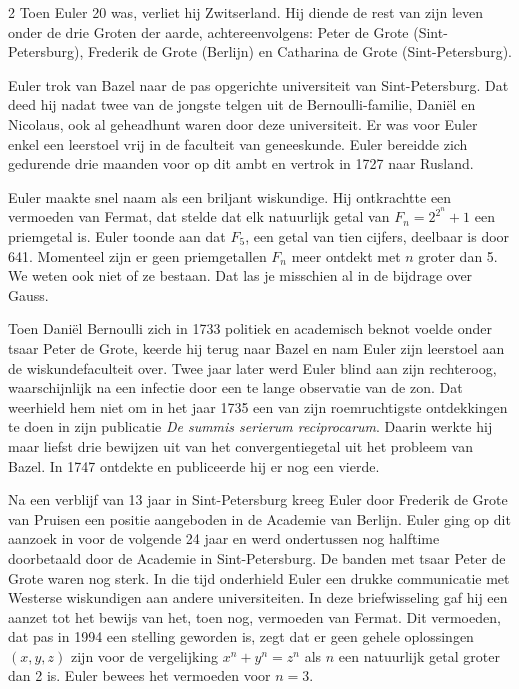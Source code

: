 \begin{multicols}{2}
	Toen Euler 20 was, verliet hij Zwitserland. Hij diende de rest van zijn leven onder de drie Groten der aarde, achtereenvolgens: Peter de Grote (Sint-Petersburg), Frederik de Grote (Berlijn) en Catharina de Grote (Sint-Petersburg).
	
	Euler trok van Bazel naar de pas opgerichte universiteit van Sint-Petersburg. Dat deed hij nadat twee van de jongste telgen uit de Bernoulli-familie, Daniël en Nicolaus, ook al  geheadhunt waren door deze universiteit. Er was voor Euler enkel een leerstoel vrij in de faculteit van geneeskunde. Euler bereidde zich gedurende drie maanden voor op dit ambt en vertrok in 1727 naar Rusland. 
	
	Euler maakte snel naam als een briljant wiskundige. Hij ontkrachtte een vermoeden van Fermat, dat stelde dat elk natuurlijk getal van $F_n=2^{2^n}+1$ een priemgetal is. Euler toonde aan dat $F_5$, een getal van tien cijfers, deelbaar is door 641. Momenteel zijn er geen priemgetallen $F_n$ meer ontdekt met $n$ groter dan 5. We weten ook niet of ze bestaan. Dat las je misschien al in de bijdrage over Gauss.
	
	Toen Daniël Bernoulli zich in 1733 politiek en academisch beknot voelde onder tsaar Peter de Grote, keerde hij terug naar Bazel en nam Euler zijn leerstoel aan de wiskundefaculteit over. Twee jaar later werd Euler blind aan zijn rechteroog, waarschijnlijk na een infectie door een te lange observatie van de zon. Dat weerhield hem niet om in het jaar 1735 een van zijn roemruchtigste ontdekkingen te doen in zijn publicatie \emph{De summis serierum reciprocarum}. Daarin werkte hij maar liefst drie bewijzen uit van het convergentiegetal uit het probleem van Bazel. In 1747 ontdekte en publiceerde hij er nog een vierde.
	
	Na een verblijf van 13 jaar in Sint-Petersburg kreeg Euler door Frederik de Grote van Pruisen een positie aangeboden in de Academie van Berlijn. Euler ging op dit aanzoek in voor de volgende 24 jaar en werd ondertussen nog halftime doorbetaald door de Academie in Sint-Petersburg. De banden met tsaar Peter de Grote waren nog sterk. In die tijd onderhield Euler een drukke communicatie met Westerse wiskundigen aan andere universiteiten. In deze briefwisseling gaf hij een aanzet tot het bewijs van het, toen nog, vermoeden van Fermat. Dit vermoeden, dat pas in 1994 een stelling geworden is, zegt dat er geen gehele oplossingen $(x,y,z)$ zijn voor de vergelijking $x^n+y^n=z^n$ als $n$ een natuurlijk getal groter dan 2 is. Euler bewees het vermoeden voor $n=3$.
	

\end{multicols}
